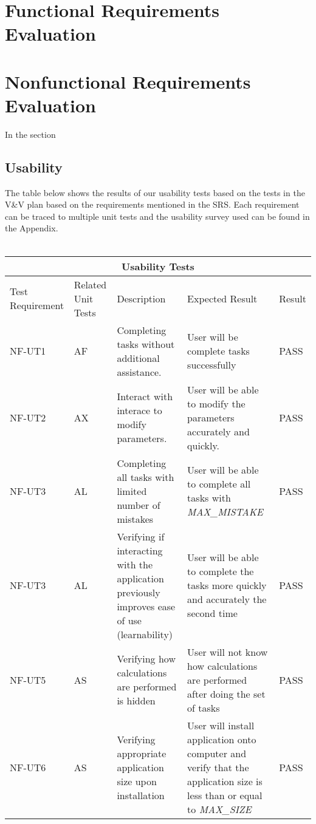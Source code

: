 \documentclass[12pt, titlepage]{article}
\begin{document}
\section{Functional Requirements Evaluation}

\section{Nonfunctional Requirements Evaluation}

In the section

\pagebreak
\subsection{Usability}
The table below shows the results of our usability tests based on the tests in the V\&V plan based on the requirements mentioned in the SRS.
Each requirement can be traced to multiple unit tests and the usability survey used can be found in the Appendix.\\
\\
\begin{tabular}{ |p{2.5cm}||p{2cm}|p{4cm}|p{4cm}|p{1.5cm}| }
  \hline
  \multicolumn{5}{|c|}{Usability Tests} \\
  \hline
  Test Requirement & Related Unit Tests & Description & Expected Result & Result\\
  \hline
  NF-UT1   & AF  & Completing tasks without additional assistance. & User will be complete tasks successfully & PASS\\
  \hline
  NF-UT2   & AX  & Interact with interace to modify parameters. & User will be able to modify the parameters accurately and quickly.& PASS\\
  \hline
  NF-UT3   & AL  & Completing all tasks with limited number of mistakes & User will be able to complete all tasks with \textsl{MAX\_MISTAKE} & PASS\\
  \hline
  NF-UT3   & AL  & Verifying if interacting with the application previously improves ease of use (learnability)  & User will be able to complete the tasks more quickly and accurately the second time & PASS\\
  \hline
  NF-UT5   & AS  & Verifying how calculations are performed is hidden &  User will not know how calculations are performed after doing the set of tasks & PASS\\
  \hline
  NF-UT6   & AS  & Verifying appropriate application size upon installation&  User will install application onto computer and verify that the application size is less than or equal to \textsl{MAX\_SIZE} & PASS\\
  \hline
 \end{tabular}
		
\end{document}

